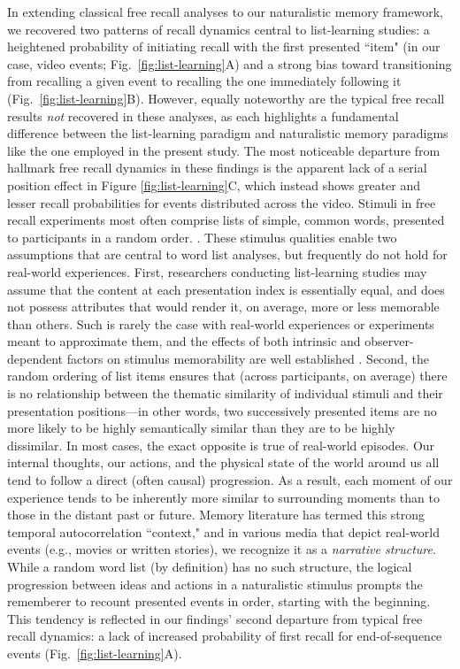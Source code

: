\documentclass{article}
\begin{document}
In extending classical free recall analyses to our naturalistic memory framework, we recovered two patterns of recall dynamics central to list-learning studies: a heightened probability of initiating recall with the first presented ``item" (in our case, video events; Fig.~\ref{fig:list-learning}A) and a strong bias toward transitioning from recalling a given event to recalling the one immediately following it (Fig.~\ref{fig:list-learning}B).  However, equally noteworthy are the typical free recall results \textit{not} recovered in these analyses, as each highlights a fundamental difference between the list-learning paradigm and naturalistic memory paradigms like the one employed in the present study.  The most noticeable departure from hallmark free recall dynamics in these findings is the apparent lack of a serial position effect in Figure \ref{fig:list-learning}C, which instead shows greater and lesser recall probabilities for events distributed across the video.  Stimuli in free recall experiments most often comprise lists of simple, common words, presented to participants in a random order. \citep[In fact, numerous word pools have been developed based on these criteria; e.g.,][]{FrieEtal82}.  These stimulus qualities enable two assumptions that are central to word list analyses, but frequently do not hold for real-world experiences.  First, researchers conducting list-learning studies may assume that the content at each presentation index is essentially equal, and does not possess attributes that would render it, on average, more or less memorable than others.  Such is rarely the case with real-world experiences or experiments meant to approximate them, and the effects of both intrinsic and observer-dependent factors on stimulus memorability are well established \citep[for review see][]{ChunTurk07, ByliEtal15, TyngEtal17}.  Second, the random ordering of list items ensures that (across participants, on average) there is no relationship between the thematic similarity of individual stimuli and their presentation positions---in other words, two successively presented items are no more likely to be highly semantically similar than they are to be highly dissimilar.  In most cases, the exact opposite is true of real-world episodes.  Our internal thoughts, our actions, and the physical state of the world around us all tend to follow a direct (often causal) progression.  As a result, each moment of our experience tends to be inherently more similar to surrounding moments than to those in the distant past or future.  Memory literature has termed this strong temporal autocorrelation ``context," and in various media that depict real-world events (e.g., movies or written stories), we recognize it as a \textit{narrative structure}.  While a random word list (by definition) has no such structure, the logical progression between ideas and actions in a naturalistic stimulus prompts the rememberer to recount presented events in order, starting with the beginning.  This tendency is reflected in our findings' second departure from typical free recall dynamics: a lack of increased probability of first recall for end-of-sequence events (Fig.~\ref{fig:list-learning}A).
\end{document}
